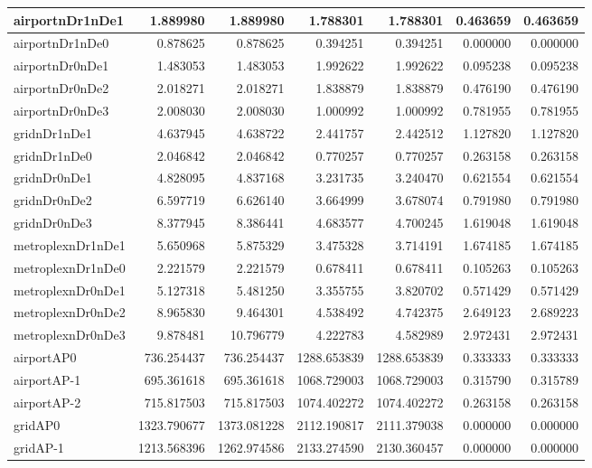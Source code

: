 \begin{longtable}{|l|r|r|r|r|r|r|}
\endlastfoot
airportnDr1nDe1 & 1.889980 & 1.889980 & 1.788301 & 1.788301 & 0.463659 & 0.463659 \\ \hline
airportnDr1nDe0 & 0.878625 & 0.878625 & 0.394251 & 0.394251 & 0.000000 & 0.000000 \\ \hline
airportnDr0nDe1 & 1.483053 & 1.483053 & 1.992622 & 1.992622 & 0.095238 & 0.095238 \\ \hline
airportnDr0nDe2 & 2.018271 & 2.018271 & 1.838879 & 1.838879 & 0.476190 & 0.476190 \\ \hline
airportnDr0nDe3 & 2.008030 & 2.008030 & 1.000992 & 1.000992 & 0.781955 & 0.781955 \\ \hline
gridnDr1nDe1 & 4.637945 & 4.638722 & 2.441757 & 2.442512 & 1.127820 & 1.127820 \\ \hline
gridnDr1nDe0 & 2.046842 & 2.046842 & 0.770257 & 0.770257 & 0.263158 & 0.263158 \\ \hline
gridnDr0nDe1 & 4.828095 & 4.837168 & 3.231735 & 3.240470 & 0.621554 & 0.621554 \\ \hline
gridnDr0nDe2 & 6.597719 & 6.626140 & 3.664999 & 3.678074 & 0.791980 & 0.791980 \\ \hline
gridnDr0nDe3 & 8.377945 & 8.386441 & 4.683577 & 4.700245 & 1.619048 & 1.619048 \\ \hline
metroplexnDr1nDe1 & 5.650968 & 5.875329 & 3.475328 & 3.714191 & 1.674185 & 1.674185 \\ \hline
metroplexnDr1nDe0 & 2.221579 & 2.221579 & 0.678411 & 0.678411 & 0.105263 & 0.105263 \\ \hline
metroplexnDr0nDe1 & 5.127318 & 5.481250 & 3.355755 & 3.820702 & 0.571429 & 0.571429 \\ \hline
metroplexnDr0nDe2 & 8.965830 & 9.464301 & 4.538492 & 4.742375 & 2.649123 & 2.689223 \\ \hline
metroplexnDr0nDe3 & 9.878481 & 10.796779 & 4.222783 & 4.582989 & 2.972431 & 2.972431 \\ \hline
airportAP0 & 736.254437 & 736.254437 & 1288.653839 & 1288.653839 & 0.333333 & 0.333333 \\ \hline
airportAP-1 & 695.361618 & 695.361618 & 1068.729003 & 1068.729003 & 0.315790 & 0.315789 \\ \hline
airportAP-2 & 715.817503 & 715.817503 & 1074.402272 & 1074.402272 & 0.263158 & 0.263158 \\ \hline
gridAP0 & 1323.790677 & 1373.081228 & 2112.190817 & 2111.379038 & 0.000000 & 0.000000 \\ \hline
gridAP-1 & 1213.568396 & 1262.974586 & 2133.274590 & 2130.360457 & 0.000000 & 0.000000 \\ \hline

\end{longtable}
